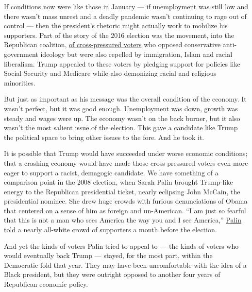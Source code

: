 If conditions now were like those in January --- if unemployment was
still low and there wasn't mass unrest and a deadly pandemic wasn't
continuing to rage out of control --- then the president's rhetoric
might actually work to mobilize his supporters. Part of the story of the
2016 election was the movement, into the Republican coalition,
\href{https://www.nytimes3xbfgragh.onion/2019/03/29/opinion/sunday/trump-obamacare.html}{of
cross-pressured voters} who opposed conservative anti-government
ideology but were also repelled by immigration, Islam and racial
liberalism. Trump appealed to these voters by pledging support for
policies like Social Security and Medicare while also demonizing racial
and religious minorities.

But just as important as his message was the overall condition of the
economy. It wasn't perfect, but it was good enough. Unemployment was
down, growth was steady and wages were up. The economy wasn't on the
back burner, but it also wasn't the most salient issue of the election.
This gave a candidate like Trump the political space to bring other
issues to the fore. And he took it.

It is possible that Trump would have succeeded under worse economic
conditions; that a crashing economy would have made those
cross-pressured voters even more eager to support a racist, demagogic
candidate. We have something of a comparison point in the 2008 election,
when Sarah Palin brought Trump-like energy to the Republican
presidential ticket, nearly eclipsing John McCain, the presidential
nominee. She drew huge crowds with furious denunciations of Obama that
\href{https://radio.wosu.org/post/how-sarah-palin-paved-way-donald-trump\#stream/0}{centered
on} a sense of him as foreign and un-American. ``I am just so fearful
that this is not a man who sees America the way you and I see America,''
\href{https://books.google.com/books?id=7eKrQrTafusC\&lpg=PA152\&ots=MEzOQJgKyM\&dq=\%22not\%20a\%20man\%20who\%20sees\%20america\%20the\%20way\%20you\%20and\%20i\%20see\%20america\%22\&pg=PA152\#v=onepage\&q=\%22not\%20a\%20man\%20who\%20sees\%20america\%20the\%20way\%20you\%20and\%20i\%20see\%20america\%22\&f=false}{Palin
told} a nearly all-white crowd of supporters a month before the
election.

And yet the kinds of voters Palin tried to appeal to --- the kinds of
voters who would eventually back Trump --- stayed, for the most part,
within the Democratic fold that year. They may have been uncomfortable
with the idea of a Black president, but they were outright opposed to
another four years of Republican economic policy.


